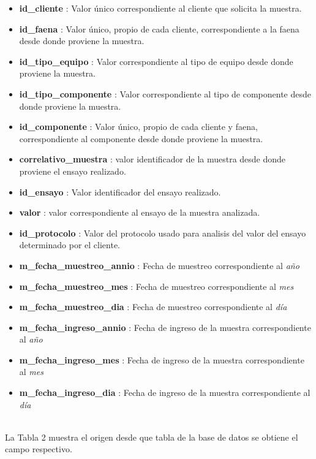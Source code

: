 \documentclass{article}
\begin{document}
\begin{itemize}
	\item \textbf{id\_cliente} : Valor único correspondiente al cliente que solicita la muestra.
	\item \textbf{id\_faena} : Valor único, propio de cada cliente, correspondiente a la faena desde donde proviene la muestra.
	\item \textbf{id\_tipo\_equipo} : Valor correspondiente al tipo de equipo desde donde proviene la muestra.
	\item \textbf{id\_tipo\_componente} : Valor correspondiente al tipo de componente desde donde proviene la muestra.
	\item \textbf{id\_componente} : Valor único, propio de cada cliente y faena, correspondiente al componente desde donde proviene la muestra.
	\item \textbf{correlativo\_muestra} : valor identificador de la muestra desde donde proviene el ensayo realizado.
	\item \textbf{id\_ensayo} : Valor identificador del ensayo realizado.
	\item \textbf{valor} : valor correspondiente al ensayo de la muestra analizada.
	\item \textbf{id\_protocolo} : Valor del protocolo usado para analisis del valor del ensayo determinado por el cliente.
	\item \textbf{m\_fecha\_muestreo\_annio} : Fecha de muestreo correspondiente al \textit{año}
	\item \textbf{m\_fecha\_muestreo\_mes} : Fecha de muestreo correspondiente al \textit{mes}
	\item \textbf{m\_fecha\_muestreo\_dia} : Fecha de muestreo correspondiente al \textit{día}
	\item \textbf{m\_fecha\_ingreso\_annio} : Fecha de ingreso de la muestra correspondiente al \textit{año}
	\item \textbf{m\_fecha\_ingreso\_mes} : Fecha de ingreso de la muestra correspondiente al \textit{mes}
	\item \textbf{m\_fecha\_ingreso\_dia} : Fecha de ingreso de la muestra correspondiente al \textit{día}
	
\end{itemize}
~\\
La Tabla 2 muestra el origen desde que tabla de la base de datos se obtiene el campo respectivo.
\end{document}
